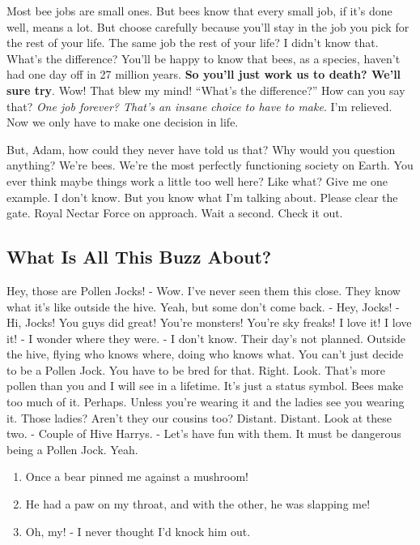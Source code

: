 \documentclass[
  letterpaper,
  twocolumn]{article}
\providecommand{\tightlist}{%
  \setlength{\itemsep}{0pt}\setlength{\parskip}{0pt}}
\begin{document}
Most bee jobs are small ones. But bees know that every small job, if
it's done well, means a lot. But choose carefully because you'll stay in
the job you pick for the rest of your life. The same job the rest of
your life? I didn't know that. What's the difference? You'll be happy to
know that bees, as a species, haven't had one day off in 27 million
years. \textbf{So you'll just work us to death? We'll sure try}. Wow!
That blew my mind! ``What's the difference?'' How can you say that?
\emph{One job forever? That's an insane choice to have to make}. I'm
relieved. Now we only have to make one decision in life.

But, Adam, how could they never have told us that? Why would you
question anything? We're bees. We're the most perfectly functioning
society on Earth. You ever think maybe things work a little too well
here? Like what? Give me one example. I don't know. But you know what
I'm talking about. Please clear the gate. Royal Nectar Force on
approach. Wait a second. Check it out.

\hypertarget{what-is-all-this-buzz-about}{%
\subsection{What Is All This Buzz
About?}\label{what-is-all-this-buzz-about}}

Hey, those are Pollen Jocks! - Wow. I've never seen them this close.
They know what it's like outside the hive. Yeah, but some don't come
back. - Hey, Jocks! - Hi, Jocks! You guys did great! You're monsters!
You're sky freaks! I love it! I love it! - I wonder where they were. - I
don't know. Their day's not planned. Outside the hive, flying who knows
where, doing who knows what. You can't just decide to be a Pollen Jock.
You have to be bred for that. Right. Look. That's more pollen than you
and I will see in a lifetime. It's just a status symbol. Bees make too
much of it. Perhaps. Unless you're wearing it and the ladies see you
wearing it. Those ladies? Aren't they our cousins too? Distant. Distant.
Look at these two. - Couple of Hive Harrys. - Let's have fun with them.
It must be dangerous being a Pollen Jock. Yeah.

\begin{enumerate}
\def\labelenumi{\arabic{enumi}.}
\tightlist
\item
  Once a bear pinned me against a mushroom!
\item
  He had a paw on my throat, and with the other, he was slapping me!
\item
  Oh, my! - I never thought I'd knock him out.
\end{enumerate}
\end{document}
